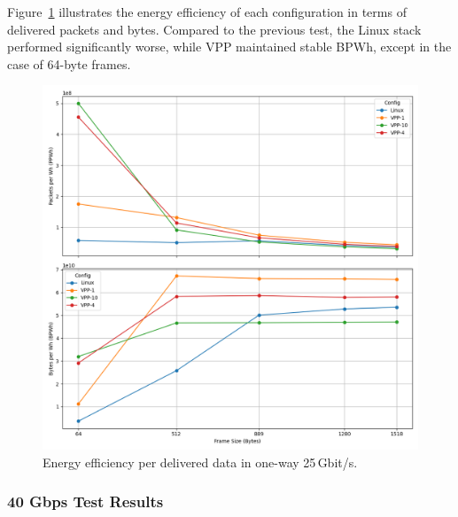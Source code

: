 Figure~\ref{fig:25g} illustrates the energy efficiency of each configuration in terms of delivered packets and bytes.
Compared to the previous test, the Linux stack performed significantly worse, while VPP maintained stable BPWh, except in the case of 64-byte frames.

\begin{figure}[!htbp]
    \centering
    \includegraphics[width=\linewidth]{images/consumption-25g.png}
    \caption{Energy efficiency per delivered data in one-way 25\,Gbit/s.}
    \label{fig:25g}
\end{figure}


\subsubsection{40 Gbps Test Results}

